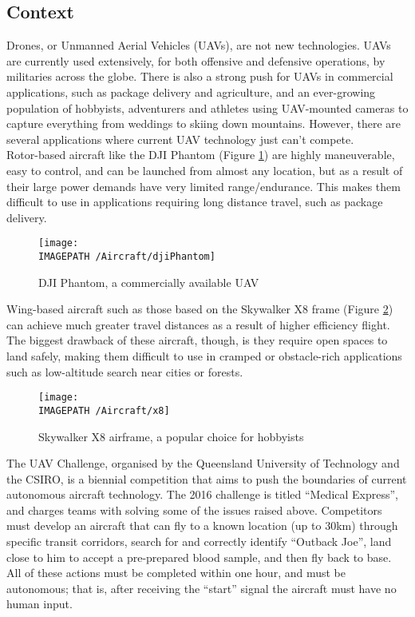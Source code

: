 \subsection{Context}
Drones, or Unmanned Aerial Vehicles (UAVs), are not new technologies. UAVs are currently used extensively, for both offensive\cite{ref:offence} and defensive\cite{ref:defence} operations, by militaries across the globe. There is also a strong push for UAVs in commercial applications, such as package delivery\cite{ref:package} and agriculture\cite{ref:agriculture}, and an ever-growing population of hobbyists\cite{ref:hobby}, adventurers\cite{ref:adventure} and athletes\cite{ref:sport} using UAV-mounted cameras to capture everything from weddings to skiing down mountains. However, there are several applications where current UAV technology just can't compete.\\

Rotor-based aircraft like the DJI Phantom (Figure \ref{fig:dji}) are highly maneuverable, easy to control, and can be launched from almost any location, but as a result of their large power demands have very limited range/endurance. This makes them difficult to use in applications requiring long distance travel, such as package delivery.

\begin{figure}[!h]
	\centering
	\texttt{[image: \\IMAGEPATH /Aircraft/djiPhantom]}
	\caption{DJI Phantom, a commercially available UAV}
	\label{fig:dji}
\end{figure}

Wing-based aircraft such as those based on the Skywalker X8 frame\cite{ref:x8} (Figure \ref{fig:x8}) can achieve much greater travel distances as a result of higher efficiency flight. The biggest drawback of these aircraft, though, is they require open spaces to land safely, making them difficult to use in cramped or obstacle-rich applications such as low-altitude search near cities or forests.

\begin{figure}[!h]
	\centering
	\texttt{[image: \\IMAGEPATH /Aircraft/x8]}
	\caption{Skywalker X8 airframe, a popular choice for hobbyists}
	\label{fig:x8}
\end{figure}
 
The UAV Challenge\cite{ref:challenge}, organised by the Queensland University of Technology and the CSIRO, is a biennial competition that aims to push the boundaries of current autonomous aircraft technology. The 2016 challenge is titled ``Medical Express'', and charges teams with solving some of the issues raised above. Competitors must develop an aircraft that can fly to a known location (up to 30km) through specific transit corridors, search for and correctly identify ``Outback Joe'', land close to him to accept a pre-prepared blood sample, and then fly back to base. All of these actions must be completed within one hour, and must be autonomous; that is, after receiving the ``start'' signal the aircraft must have no human input.\\


